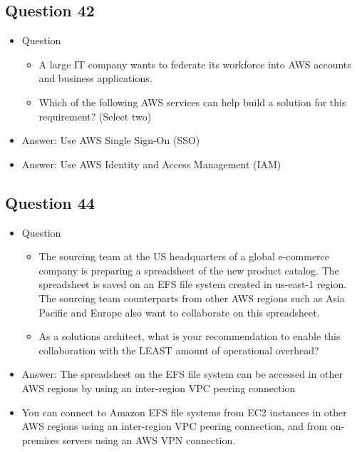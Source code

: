 \documentclass[]{scrartcl}
\begin{document}
\subsection{Question 42}
\begin{itemize}
	\item Question
	\begin{itemize}
		\item A large IT company wants to federate its workforce into AWS accounts and business applications.
		\item Which of the following AWS services can help build a solution for this requirement? (Select two)
	\end{itemize}
	\item Answer: Use AWS Single Sign-On (SSO)
	\item Answer: Use AWS Identity and Access Management (IAM)
\end{itemize}

\subsection{Question 44}
\begin{itemize}
	\item Question
	\begin{itemize}
		\item The sourcing team at the US headquarters of a global e-commerce company is preparing a spreadsheet of the new product catalog. The spreadsheet is saved on an EFS file system created in us-east-1 region. The sourcing team counterparts from other AWS regions such as Asia Pacific and Europe also want to collaborate on this spreadsheet.
		\item As a solutions architect, what is your recommendation to enable this collaboration with the LEAST amount of operational overhead?
	\end{itemize}
	\item Answer: The spreadsheet on the EFS file system can be accessed in other AWS regions by using an inter-region VPC peering connection
	\item You can connect to Amazon EFS file systems from EC2 instances in other AWS regions using an inter-region VPC peering connection, and from on-premises servers using an AWS VPN connection. 
\end{itemize}
\end{document}
